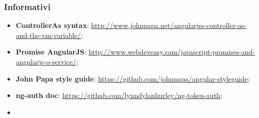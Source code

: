 		\subsubsection{Informativi} %
		\label{ssub:informativi}
			\begin{itemize}
				\item \textbf{ControllerAs syntax}: \url{http://www.johnpapa.net/angularjss-controller-as-and-the-vm-variable/};
				\item \textbf{Promise AngularJS}: \url{http://www.webdeveasy.com/javascript-promises-and-angularjs-q-service/};
				\item \textbf{John Papa style guide}: \url{https://github.com/johnpapa/angular-styleguide};
				\item \textbf{ng-auth doc}: \url{https://github.com/lynndylanhurley/ng-token-auth};
				\item
			\end{itemize}
